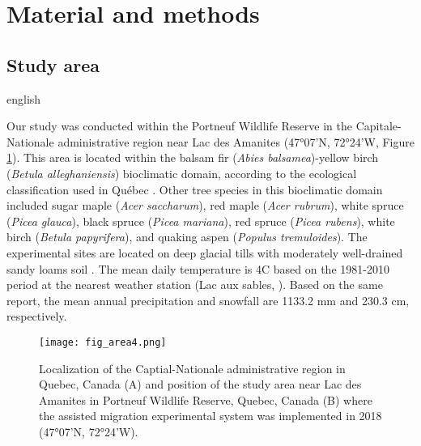 \section*{Material and methods}
\label{sec:matmet1}

\subsection*{Study area}
\label{subsec:area}

\begin{otherlanguage*}{english}

  Our study was conducted within the Portneuf Wildlife Reserve in the Capitale-Nationale administrative region near Lac des Amanites (47°07’N, 72°24’W, Figure \ref{fig:area}). 
  This area is located within the balsam fir (\textit{Abies balsamea})-yellow birch (\textit{Betula alleghaniensis}) bioclimatic domain, according to the ecological classification used in Québec \citep{saucierChapitreEcologieForestiere2009}. 
  Other tree species in this bioclimatic domain included sugar maple (\textit{Acer saccharum}), red maple (\textit{Acer rubrum}), white spruce (\textit{Picea glauca}), black spruce (\textit{Picea mariana}), red spruce (\textit{Picea rubens}), white birch (\textit{Betula papyrifera}), and quaking aspen (\textit{Populus tremuloides})\citep{olaBelowgroundCarbonStocks2024}. 
  The experimental sites are located on deep glacial tills with moderately well-drained sandy loams soil \citep{CanadianSystemSoil1998}. 
  The mean daily temperature is 4C based on the 1981-2010 period at the nearest weather station (Lac aux sables, \citealp{environmentcanadaCanadianClimateNormals2019}). 
  Based on the same report, the mean annual precipitation and snowfall are 1133.2 mm and 230.3 cm, respectively. 

\end{otherlanguage*}

\begin{figure}[ht!]
	\centering
	\texttt{[image: fig\_area4.png]}
	\caption[Localization of the Capitale-Nationale administrative region in Quebec, Canada and position of the study area near Lac des Amanites in Portneuf Wildlife Reserve, Quebec, Canada.]
  {Localization of the Captial-Nationale administrative region in Quebec, Canada (A) and position of the study area near Lac des Amanites in Portneuf Wildlife Reserve, Quebec, Canada (B) where the assisted migration experimental system was implemented in 2018 (47°07'N, 72°24'W).}
	\label{fig:area}
	\end{figure}  


